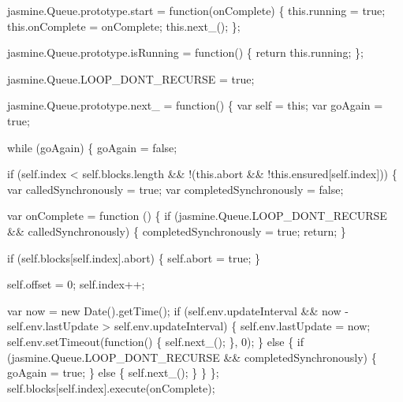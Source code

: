\begin{DoxyCodeInclude}
jasmine.Queue.prototype.start = \textcolor{keyword}{function}(onComplete) \{
  this.running = \textcolor{keyword}{true};
  this.onComplete = onComplete;
  this.next\_();
\};

jasmine.Queue.prototype.isRunning = \textcolor{keyword}{function}() \{
  \textcolor{keywordflow}{return} this.running;
\};

jasmine.Queue.LOOP\_DONT\_RECURSE = \textcolor{keyword}{true};

jasmine.Queue.prototype.next\_ = \textcolor{keyword}{function}() \{
  var \textcolor{keyword}{self} = \textcolor{keyword}{this};
  var goAgain = \textcolor{keyword}{true};

  \textcolor{keywordflow}{while} (goAgain) \{
    goAgain = \textcolor{keyword}{false};

    \textcolor{keywordflow}{if} (\textcolor{keyword}{self}.index < \textcolor{keyword}{self}.blocks.length && !(\textcolor{keyword}{this}.abort && !\textcolor{keyword}{this}.ensured[\textcolor{keyword}{self}.index])) \{
      var calledSynchronously = \textcolor{keyword}{true};
      var completedSynchronously = \textcolor{keyword}{false};

      var onComplete = \textcolor{keyword}{function} () \{
        \textcolor{keywordflow}{if} (jasmine.Queue.LOOP\_DONT\_RECURSE && calledSynchronously) \{
          completedSynchronously = \textcolor{keyword}{true};
          \textcolor{keywordflow}{return};
        \}

        \textcolor{keywordflow}{if} (\textcolor{keyword}{self}.blocks[\textcolor{keyword}{self}.index].abort) \{
          \textcolor{keyword}{self}.abort = \textcolor{keyword}{true};
        \}

        \textcolor{keyword}{self}.offset = 0;
        \textcolor{keyword}{self}.index++;

        var now = \textcolor{keyword}{new} Date().getTime();
        \textcolor{keywordflow}{if} (\textcolor{keyword}{self}.env.updateInterval && now - \textcolor{keyword}{self}.env.lastUpdate > \textcolor{keyword}{self}.env.updateInterval) \{
          \textcolor{keyword}{self}.env.lastUpdate = now;
          \textcolor{keyword}{self}.env.setTimeout(\textcolor{keyword}{function}() \{
            \textcolor{keyword}{self}.next\_();
          \}, 0);
        \} \textcolor{keywordflow}{else} \{
          \textcolor{keywordflow}{if} (jasmine.Queue.LOOP\_DONT\_RECURSE && completedSynchronously) \{
            goAgain = \textcolor{keyword}{true};
          \} \textcolor{keywordflow}{else} \{
            \textcolor{keyword}{self}.next\_();
          \}
        \}
      \};
      \textcolor{keyword}{self}.blocks[\textcolor{keyword}{self}.index].execute(onComplete);


\end{DoxyCodeInclude}
